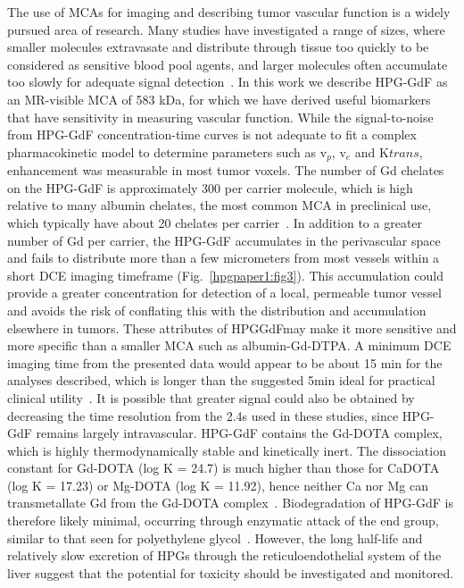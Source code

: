 The use of MCAs for imaging and describing tumor vascular function is a widely pursued area of research.
Many studies have investigated a range of sizes, where smaller molecules extravasate and distribute through tissue too quickly to be considered as sensitive blood pool agents, and larger molecules often accumulate too slowly for adequate signal detection~\cite{Kyle:2007ch,Tang:2013fi,Sourbron:2011ce}.
In this work we describe HPG-GdF as an MR-visible MCA of 583 kDa, for which we have derived useful biomarkers that have sensitivity in measuring vascular function.
While the signal-to-noise from HPG-GdF concentration-time curves is not adequate to fit a complex pharmacokinetic model to determine parameters such as v$_p$, v$_e$ and K${trans}$, enhancement was measurable in most tumor voxels.
The number of Gd chelates on the HPG-GdF is approximately 300 per carrier molecule, which is high relative to many albumin chelates, the most common MCA in preclinical use, which typically have about 20 chelates per carrier~\cite{Ogan:1987tg}.
In addition to a greater number of Gd per carrier, the HPG-GdF accumulates in the perivascular space and fails to distribute more than a few micrometers from most vessels within a short DCE imaging timeframe (Fig.~\ref{hpgpaper1:fig3}).
This accumulation could provide a greater concentration for detection of a local, permeable tumor vessel and avoids the risk of conflating this with the distribution and accumulation elsewhere in tumors.
These attributes of HPGGdFmay make it more sensitive and more specific than a smaller MCA such as albumin-Gd-DTPA.
A minimum DCE imaging time from the presented data would appear to be about 15 min for the analyses described, which is longer than the suggested 5min ideal for practical clinical utility~\cite{Turetschek:2004bw}.
It is possible that greater signal could also be obtained by decreasing the time resolution from the 2.4s used in these studies, since HPG-GdF remains largely intravascular.
HPG-GdF contains the Gd-DOTA complex, which is highly thermodynamically stable and kinetically inert.
The dissociation constant for Gd-DOTA (log K = 24.7) is much higher than those for CaDOTA (log K = 17.23) or Mg-DOTA (log K = 11.92), hence neither Ca nor Mg can transmetallate Gd from the Gd-DOTA complex~\cite{Baranyai:2005ta}.
Biodegradation of HPG-GdF is therefore likely minimal, occurring through enzymatic attack of the end group, similar to that seen for polyethylene glycol~\cite{Kawai:2002fc}.
However, the long half-life and relatively slow excretion of HPGs through the reticuloendothelial system of the liver suggest that the potential for toxicity should be investigated and monitored.
